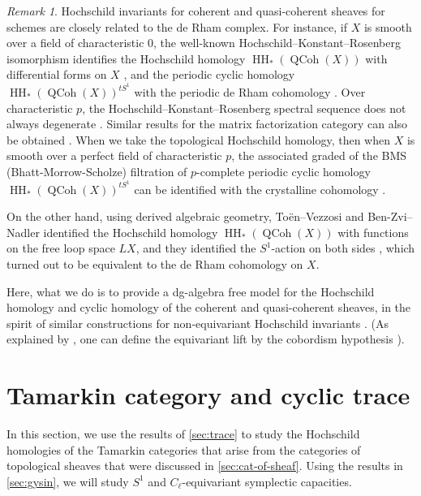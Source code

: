 \documentclass[11pt]{amsart}
\numberwithin{equation}{section}
\theoremstyle{plain}
\theoremstyle{definition}
\theoremstyle{remark}
\newtheorem{RMK}[rmk]{Remark}
\newcommand\HH{\operatorname{HH}}
\newcommand\QCoh{\operatorname{QCoh}}
\begin{document}
\begin{RMK}
Hochschild invariants for coherent and quasi-coherent sheaves for schemes are closely related to the de Rham complex. For instance, if $X$ is smooth over a field of characteristic $0$, the well-known Hochschild--Konstant--Rosenberg isomorphism identifies the Hochschild homology $\HH_*(\QCoh(X))$ with differential forms on $X$ \cite{HKR,LodayCyclic,Yekutieli}, and the periodic cyclic homology $\HH_*(\QCoh(X))^{tS^1}$ with the periodic de Rham cohomology \cite{FeigenTsygan,LodayCyclic,toen_vezzosi_2011}. Over characteristic $p$, the Hochschild--Konstant--Rosenberg spectral sequence does not always degenerate \cite{AntieauBhattMathew}. Similar results for the matrix factorization category can also be obtained \cite{Preygel,Efimov-MF}.
When we take the topological Hochschild homology, then when $X$ is smooth over a perfect field of characteristic $p$, the associated graded of the BMS (Bhatt-Morrow-Scholze) filtration of $p$-complete periodic cyclic homology $\HH_*(\QCoh(X))^{tS^1}$ can be identified with the crystalline cohomology \cite{AntieauNikolaus}.

On the other hand, using derived algebraic geometry, To\"en--Vezzosi and Ben-Zvi--Nadler identified the Hochschild homology $\HH_*(\QCoh(X))$ with functions on the free loop space $LX$, and they identified the $S^1$-action on both sides \cite{toen_vezzosi_2011,toen_vezzosi_15,Ben-Zvi-Nadlerloopspaceandconnection}, which turned out to be equivalent to the de Rham cohomology on $X$. 

Here, what we do is to provide a dg-algebra free model for the Hochschild homology and cyclic homology of the coherent and quasi-coherent sheaves, in the spirit of similar constructions for non-equivariant Hochschild invariants \cite{KuznetsovHochschild,Ben-Zvi-Francis-Nadler,Preygel,Ben-Zvi-Nadler-trace}. (As explained by \cite{toen_vezzosi_2011,Ben-Zvi-Nadler-trace,Hoyois-Scherotzke-Sibilla}, one can define the equivariant lift by the cobordism hypothesis \cite{Lurie-cobordism}).
\end{RMK}



\section{Tamarkin category and cyclic trace}
In this section, we use the results of \autoref{sec:trace} to study the Hochschild homologies of the Tamarkin categories that arise from the categories of topological sheaves that were discussed in \autoref{sec:cat-of-sheaf}.
Using the results in \autoref{sec:gysin}, we will study $S^1$ and $C_\ell$-equivariant symplectic capacities.
\end{document}
